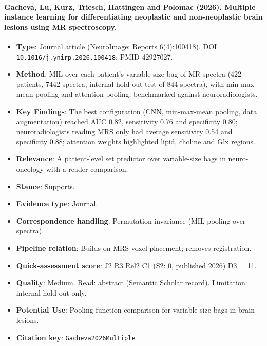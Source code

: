 \documentclass[journal,onecolumn]{IEEEtran}
\begin{document}
\paragraph{Gacheva, Lu, Kurz, Triesch, Hattingen and Polomac (2026). Multiple instance learning for differentiating neoplastic and non-neoplastic brain lesions using MR spectroscopy.~\cite{Gacheva2026Multiple}}\mbox{}

\begin{itemize}

\item{} \textbf{Type}: Journal article (NeuroImage: Reports 6(4):100418). DOI \nolinkurl{10.1016/j.ynirp.2026.100418}; PMID 42927027.

\item{} \textbf{Method}: MIL over each patient's variable-size bag of MR spectra (422 patients, 7442 spectra, internal hold-out test of 844 spectra), with min-max-mean pooling and attention pooling; benchmarked against neuroradiologists.

\item{} \textbf{Key Findings}: The best configuration (CNN, min-max-mean pooling, data augmentation) reached AUC 0.82, sensitivity 0.76 and specificity 0.80; neuroradiologists reading MRS only had average sensitivity 0.54 and specificity 0.88; attention weights highlighted lipid, choline and Glx regions.

\item{} \textbf{Relevance}: A patient-level set predictor over variable-size bags in neuro-oncology with a reader comparison.

\item{} \textbf{Stance}: Supports.

\item{} \textbf{Evidence type}: Journal.

\item{} \textbf{Correspondence handling}: Permutation invariance (MIL pooling over spectra).

\item{} \textbf{Pipeline relation}: Builds on MRS voxel placement; removes registration.

\item{} \textbf{Quick-assessment score}: J2 R3 Rel2 C1 (S2: 0, published 2026) D3 = 11.

\item{} \textbf{Quality}: Medium. Read: abstract (Semantic Scholar record). Limitation: internal hold-out only.

\item{} \textbf{Potential Use}: Pooling-function comparison for variable-size bags in brain lesions.

\item{} \textbf{Citation key}: \texttt{Gacheva2026Multiple}

\end{itemize}
\end{document}

